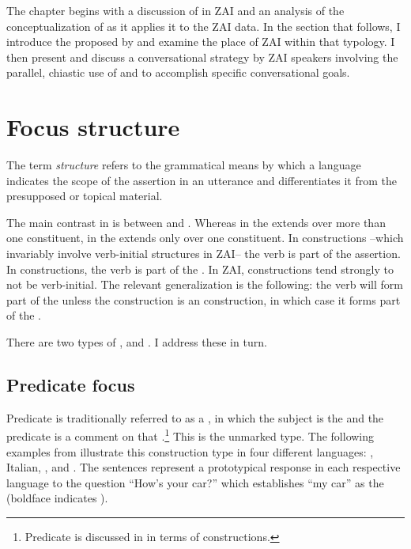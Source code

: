 \largerpage 
The chapter begins with a discussion of  in ZAI and an analysis of the conceptualization of \citet{lambrecht1994} as it applies it to the ZAI data. In the section that follows, I introduce the  proposed by \citet{vanvalin1999} and examine the place of ZAI within that typology. I then present and discuss a conversational strategy by ZAI speakers involving the parallel, chiastic use of  and  to accomplish specific conversational goals. 


\section{Focus structure}
\largerpage
The term \textit{ structure} \citep{lambrecht1994} refers to the grammatical means by which a language indicates the scope of the assertion in an utterance and differentiates it from the presupposed or topical material.

The main contrast in  is between  and . Whereas in  the  extends over more than one constituent, in  the  extends only over one constituent. In  constructions --which invariably involve verb-initial structures in ZAI-- the verb is part of the assertion. In  constructions, the verb is part of the . In ZAI,   constructions tend strongly to not be verb-initial. The relevant generalization is the following: the verb will form part of the  unless the construction is an  construction, in which case it forms part of the .  

There are two types of ,  and . I address these in turn.


\subsection{Predicate focus}\label{pfsection}

Predicate  is traditionally referred to as a , in which the subject is the  and the predicate is a comment on that .\footnote{Predicate  is discussed in  in terms of  constructions.} This is the unmarked  type. The following examples from \citet{lambrecht1994} illustrate this  construction type in four different languages: , Italian, , and . The sentences represent a prototypical response in each respective language to the question ``How's your car?'' which establishes ``my car'' as the  (boldface indicates ). 


